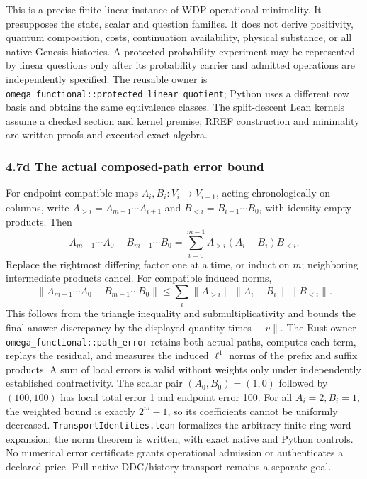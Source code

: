 \documentclass[
  english,
  10pt,
  a4paper,
]{article}
\begin{document}
This is a precise finite linear instance of WDP operational minimality.
It presupposes the state, scalar and question families. It does not
derive positivity, quantum composition, costs, continuation
availability, physical substance, or all native Genesis histories. A
protected probability experiment may be represented by linear questions
only after its probability carrier and admitted operations are
independently specified. The reusable owner is
\nolinkurl{omega_functional::protected_linear_quotient}; Python uses a
different row basis and obtains the same equivalence classes. The
split-descent Lean kernels assume a checked section and kernel premise;
RREF construction and minimality are written proofs and executed exact
algebra.

\subsubsection{4.7d The actual composed-path error
bound}\label{d-the-actual-composed-path-error-bound}

For endpoint-compatible maps \(A_i,B_i:V_i\to V_{i+1}\), acting
chronologically on columns, write \(A_{>i}=A_{m-1}\cdots A_{i+1}\) and
\(B_{<i}=B_{i-1}\cdots B_0\), with identity empty products. Then \[
A_{m-1}\cdots A_0-B_{m-1}\cdots B_0
=\sum_{i=0}^{m-1}A_{>i}(A_i-B_i)B_{<i}.
\] Replace the rightmost differing factor one at a time, or induct on
\(m\); neighboring intermediate products cancel. For compatible induced
norms, \[
\|A_{m-1}\cdots A_0-B_{m-1}\cdots B_0\|
\le\sum_i\|A_{>i}\|\,\|A_i-B_i\|\,\|B_{<i}\|.
\] This follows from the triangle inequality and submultiplicativity and
bounds the final answer discrepancy by the displayed quantity times
\(\|v\|\). The Rust owner \nolinkurl{omega_functional::path_error}
retains both actual paths, computes each term, replays the residual, and
measures the induced \(\ell^1\) norms of the prefix and suffix products.
A sum of local errors is valid without weights only under independently
established contractivity. The scalar pair \((A_0,B_0)=(1,0)\) followed
by \((100,100)\) has local total error 1 and endpoint error 100. For all
\(A_i=2,B_i=1\), the weighted bound is exactly \(2^m-1\), so its
coefficients cannot be uniformly decreased.
\texttt{TransportIdentities.lean} formalizes the arbitrary finite
ring-word expansion; the norm theorem is written, with exact native and
Python controls. No numerical error certificate grants operational
admission or authenticates a declared price. Full native DDC/history
transport remains a separate goal.
\end{document}
